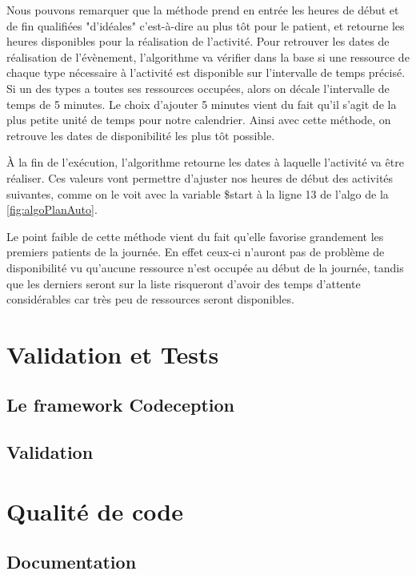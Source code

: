 \documentclass[noposter]{polytech/polytech}
\begin{document}
Nous pouvons remarquer que la méthode prend en entrée les heures de début et de fin qualifiées "d'idéales" c'est-à-dire au plus tôt pour le patient, et retourne les heures disponibles pour la réalisation de l'activité. Pour retrouver les dates de réalisation de l'évènement, l'algorithme va vérifier dans la base si une ressource de chaque type nécessaire à l'activité est disponible sur l'intervalle de temps précisé. Si un des types a toutes ses ressources occupées, alors on décale l'intervalle de temps de 5 minutes. Le choix d'ajouter 5 minutes vient du fait qu'il s'agit de la plus petite unité de temps pour notre calendrier. Ainsi avec cette méthode, on retrouve les dates de disponibilité les plus tôt possible. 

À la fin de l'exécution, l'algorithme retourne les dates à laquelle l'activité va être réaliser. Ces valeurs vont permettre d'ajuster nos heures de début des activités suivantes, comme on le voit avec la variable \$start à la ligne 13 de l'algo de la \autoref{fig:algoPlanAuto}.

Le point faible de cette méthode vient du fait qu'elle favorise grandement les premiers patients de la journée. En effet ceux-ci n'auront pas de problème de disponibilité vu qu'aucune ressource n'est occupée au début de la journée, tandis que les derniers seront sur la liste risqueront d'avoir des temps d'attente considérables car très peu de ressources seront disponibles. 


\chapter{Validation et Tests}


\section{Le framework Codeception}


\section{Validation}


\chapter{Qualité de code}


\section{Documentation}
\end{document}
